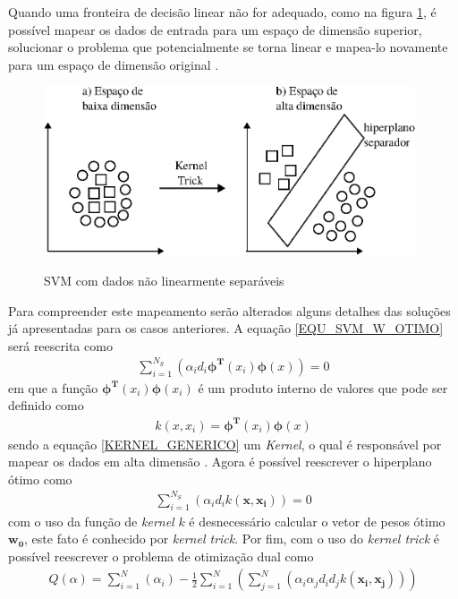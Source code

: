 Quando uma fronteira de decisão linear não for adequado, como na figura \ref{FIGURA_SVM_Caso_Nao_Separavel_KERNEL_TRICK}, é possível mapear os dados de entrada para um espaço de dimensão superior, solucionar o problema que potencialmente se torna linear e mapea-lo novamente para um espaço de dimensão original \cite{Haykin2007}.
\begin{figure}[hbt]
  \centering
  \caption{SVM com dados não linearmente separáveis}
  \includegraphics[width=11cm,height=5cm]{./secoes/conceitosFundamentais/pics/img/kernelTrick.eps}
  \label{FIGURA_SVM_Caso_Nao_Separavel_KERNEL_TRICK}
\end{figure}
Para compreender este mapeamento serão alterados alguns detalhes das soluções já apresentadas para os casos anteriores. A equação \eqref{EQU_SVM_W_OTIMO} será reescrita como
\begin{align}
\sum\limits_{i=1}^{N_{S}} \left( \alpha_{i}d_{i}\mathbf{\phi^{T}}(x_{i})\mathbf{\phi}(x) \right) = 0
\end{align}
em que a função \(\mathbf{\phi^{T}}(x_{i})\mathbf{\phi}(x_{i})\) é um produto interno de valores que pode ser definido como
\begin{align}
k(x, x_{i}) = \mathbf{\phi^{T}}(x_{i})\mathbf{\phi}(x) \label{KERNEL_GENERICO}
\end{align}
sendo a equação \eqref{KERNEL_GENERICO} um \emph{Kernel}, o qual é responsável por mapear os dados em alta dimensão \cite{Shawe2004}. Agora é possível reescrever o hiperplano ótimo como
\begin{align}
\sum\limits_{i=1}^{N_{S}} \left( \alpha_{i}d_{i}k(\mathbf{x}, \mathbf{x_{i}}) \right) = 0
\end{align}
com o uso da função de \emph{kernel} \(k\) é desnecessário calcular o vetor de pesos ótimo \(\mathbf{w_{0}}\), este fato é conhecido por \emph{kernel trick}. Por fim, com o uso do \emph{kernel trick} é possível reescrever o problema de otimização dual como
\begin{align}
Q(\alpha) = \sum\limits_{i=1}^{N} \left( \alpha_{i} \right) - \frac{1}{2} \sum\limits_{i=1}^{N} \left( \sum\limits_{j=1}^{N} \left( \alpha_{i}\alpha_{j}d_{i}d_{j} k(\mathbf{x_{i}}, \mathbf{x_{j}}) \right) \right)
\end{align}
